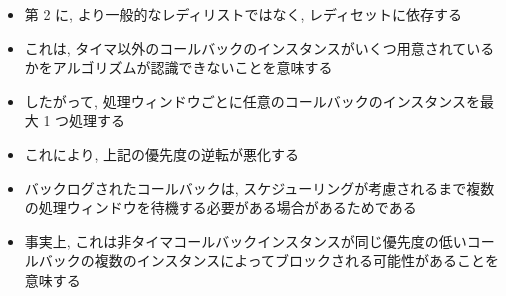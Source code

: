 \begin{frame}{}
    \begin{itemize}
        \item 第 2 に, より一般的なレディリストではなく, レディセットに依存する
        \item これは, タイマ以外のコールバックのインスタンスがいくつ用意されているかをアルゴリズムが認識できないことを意味する
        \item したがって, 処理ウィンドウごとに任意のコールバックのインスタンスを最大 1 つ処理する
        \item これにより, 上記の優先度の逆転が悪化する
        \item バックログされたコールバックは, スケジューリングが考慮されるまで複数の処理ウィンドウを待機する必要がある場合があるためである
        \item 事実上, これは非タイマコールバックインスタンスが同じ優先度の低いコールバックの複数のインスタンスによってブロックされる可能性があることを意味する
    \end{itemize}
\end{frame}
